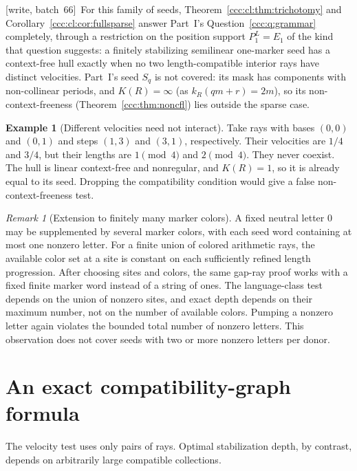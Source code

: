 \documentclass[11pt,letterpaper]{article}
\theoremstyle{definition}
\newtheorem{example}[theorem]{Example}
\theoremstyle{remark}
\newtheorem{remark}[theorem]{Remark}
\newcommand{\wsix}{\textup{[write, batch~66]}}
\begin{document}
\wsix\ For this family of seeds, Theorem~\ref{ccc:cl:thm:trichotomy} and
Corollary~\ref{ccc:cl:cor:fullsparse} answer Part~I's
Question~\ref{ccc:q:grammar} completely, through a restriction on the
position support $P_1^L=E_1$ of the kind that question suggests: a
finitely stabilizing semilinear one-marker seed has a context-free hull
exactly when no two length-compatible interior rays have distinct
velocities. Part~I's seed $S_q$ is not covered: its mask has components
with non-collinear periods, and $K(R)=\infty$ (as $k_R(qm+r)=2m$), so its
non-context-freeness (Theorem~\ref{ccc:thm:noncfl}) lies outside the sparse
case.

\begin{example}[Different velocities need not interact]\label{ccc:cl:ex:disjoint}
Take rays with bases $(0,0)$ and $(0,1)$ and steps $(1,3)$ and $(3,1)$,
respectively. Their velocities are $1/4$ and $3/4$, but their lengths are
$1\pmod4$ and $2\pmod4$. They never coexist. The hull is linear
context-free and nonregular, and $K(R)=1$, so it is already equal to its
seed. Dropping the compatibility condition would give a false
non-context-freeness test.
\end{example}

\begin{remark}[Extension to finitely many marker colors]
A fixed neutral letter $0$ may be supplemented by several marker colors,
with each seed word containing at most one nonzero letter. For a finite
union of colored arithmetic rays, the available color set at a site is
constant on each sufficiently refined length progression. After choosing
sites and colors, the same gap-ray proof works with a fixed finite marker
word instead of a string of ones. The language-class test depends on the
union of nonzero sites, and exact depth depends on their maximum number,
not on the number of available colors. Pumping a nonzero letter again
violates the bounded total number of nonzero letters. This observation
does not cover seeds with two or more nonzero letters per donor.
\end{remark}

\section{An exact compatibility-graph formula}\label{ccc:cl:sec:clique}

The velocity test uses only pairs of rays. Optimal stabilization depth,
by contrast, depends on arbitrarily large compatible collections.
\end{document}
